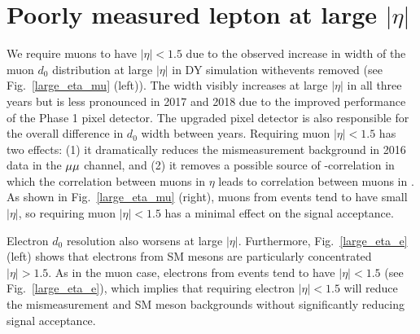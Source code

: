 \chapter{Poorly measured lepton \ad at large $|\eta|$}
\label{large_eta}

We require muons to have $|\eta|<1.5$ due to the observed increase in width of the muon $d_0$ distribution at large $|\eta|$ in DY simulation with\ztautaull events removed (see Fig.~\ref{large_eta_mu} (left)). The width visibly increases at large $|\eta|$ in all three years but is less pronounced in 2017 and 2018 due to the improved performance of the Phase 1 pixel detector. The upgraded pixel detector is also responsible for the overall difference in $d_0$ width between years. Requiring muon $|\eta|< 1.5$ has two effects: (1) it dramatically reduces the mismeasurement background in 2016 data in the ${\mu}{\mu}$ channel, and (2) it removes a possible source of \ada-\adb correlation in which the correlation between muons in $\eta$ leads to correlation between muons in \ad. As shown in Fig.~\ref{large_eta_mu} (right), muons from \stoptolb events tend to have small $|\eta|$, so requiring muon $|\eta|< 1.5$ has a minimal effect on the signal acceptance.



Electron $d_0$ resolution also worsens at large $|\eta|$. Furthermore, Fig.~\ref{large_eta_e} (left) shows that electrons from SM mesons are particularly concentrated $|\eta|>1.5$. As in the muon case, electrons from \stoptolb events tend to have $|\eta|<1.5$ (see Fig.~\ref{large_eta_e}), which implies that requiring electron $|\eta|<1.5$ will reduce the mismeasurement and SM meson backgrounds without significantly reducing signal acceptance.



\pagebreak
